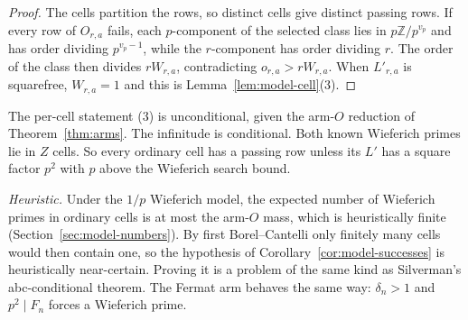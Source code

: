 \begin{proof}
The cells partition the rows, so distinct cells give distinct passing rows.
If every row of $O_{r,a}$ fails, each $p$-component of the selected class
lies in $p\mathbb Z/p^{v_p}$ and has order dividing $p^{v_p-1}$, while the
$r$-component has order dividing $r$.  The order of the class then divides
$rW_{r,a}$, contradicting $o_{r,a}>rW_{r,a}$.  When $L'_{r,a}$ is squarefree,
$W_{r,a}=1$ and this is Lemma~\ref{lem:model-cell}(3).
\end{proof}

The per-cell statement (3) is unconditional, given the arm-$O$ reduction of
Theorem~\ref{thm:arms}.  The infinitude is conditional.  Both known
Wieferich primes lie in $Z$ cells.  So every ordinary cell has a passing row
unless its $L'$ has a square factor $p^2$ with $p$ above the Wieferich search
bound.

\emph{Heuristic.}  Under the $1/p$ Wieferich model, the expected number of
Wieferich primes in ordinary cells is at most the arm-$O$ mass, which is
heuristically finite (Section~\ref{sec:model-numbers}).  By first
Borel--Cantelli only finitely many cells would then contain one, so the
hypothesis of Corollary~\ref{cor:model-successes} is heuristically
near-certain.  Proving it is a problem of the same kind as Silverman's
abc-conditional theorem.  The Fermat arm behaves the same way:
$\delta_n>1$ and $p^2\mid F_n$ forces a Wieferich prime.

